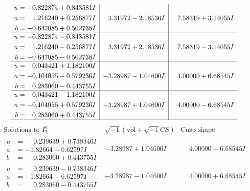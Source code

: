 \documentclass[1p]{elsarticle_modified}
\theoremstyle{definition}
\newcommand{\I}{\sqrt{-1}}
\begin{document}
$$\begin{array}{c|c|c}
\begin{aligned}
u &= -0.822874 + 0.843581 I \\
a &= \phantom{-}1.216240 + 0.256877 I \\
b &= -0.647085 + 0.502738 I\end{aligned}
 & \phantom{-}3.31972 - 2.18536 I & \phantom{-}7.58319 + 3.14055 I \\ \hline\begin{aligned}
u &= -0.822874 - 0.843581 I \\
a &= \phantom{-}1.216240 - 0.256877 I \\
b &= -0.647085 - 0.502738 I\end{aligned}
 & \phantom{-}3.31972 + 2.18536 I & \phantom{-}7.58319 - 3.14055 I \\ \hline\begin{aligned}
u &= \phantom{-}0.043421 + 1.182100 I \\
a &= -0.104055 - 0.579236 I \\
b &= \phantom{-}0.283060 - 0.443755 I\end{aligned}
 & -3.28987 - 1.04600 I & \phantom{-}4.00000 + 6.68545 I \\ \hline\begin{aligned}
u &= \phantom{-}0.043421 - 1.182100 I \\
a &= -0.104055 + 0.579236 I \\
b &= \phantom{-}0.283060 + 0.443755 I\end{aligned}
 & -3.28987 + 1.04600 I & \phantom{-}4.00000 - 6.68545 I\\
 \hline 
 \end{array}$$\newpage$$\begin{array}{c|c|c}  
\text{Solutions to }I^u_{2}& \I (\text{vol} + \sqrt{-1}CS) & \text{Cusp shape}\\
 \hline 
\begin{aligned}
u &= \phantom{-}0.239639 + 0.738346 I \\
a &= -1.82664 - 0.62597 I \\
b &= \phantom{-}0.283060 + 0.443755 I\end{aligned}
 & -3.28987 + 1.04600 I & \phantom{-}4.00000 - 6.68545 I \\ \hline\begin{aligned}
u &= \phantom{-}0.239639 - 0.738346 I \\
a &= -1.82664 + 0.62597 I \\
b &= \phantom{-}0.283060 - 0.443755 I\end{aligned}
 & -3.28987 - 1.04600 I & \phantom{-}4.00000 + 6.68545 I \\ \hline\begin{aligned}

\end{aligned}
\end{array}$$
\end{document}
